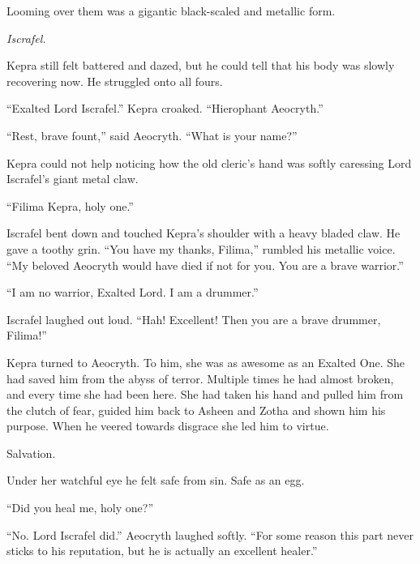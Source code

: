 \documentclass
  [a4paper,
   12pt,
   oneside
  ]%
  {article}
\begin{document}
Looming over them was a gigantic black-scaled and metallic form.

\emph{Iscrafel.}



Kepra still felt battered and dazed, but he could tell that his body was slowly recovering now. 
He struggled onto all fours. 

``Exalted Lord Iscrafel.'' Kepra croaked. ``Hierophant Aeocryth.''

``Rest, brave fount,'' said Aeocryth. ``What is your name?''

Kepra could not help noticing how the old cleric's hand was softly caressing Lord Iscrafel’s giant metal claw.

``Filima Kepra, holy one.'' 

Iscrafel bent down and touched Kepra's shoulder with a heavy bladed claw. 
He gave a toothy grin.
``You have my thanks, Filima,'' rumbled his metallic voice. ``My beloved Aeocryth would have died if not for you. You are a brave warrior.'' 

``I am no warrior, Exalted Lord. I am a drummer.''

Iscrafel laughed out loud. ``Hah! Excellent! Then you are a brave drummer, Filima!'' 

Kepra turned to Aeocryth. 
To him, she was as awesome as an Exalted One. 
She had saved him from the abyss of terror. 
Multiple times he had almost broken, and every time she had been here.
She had taken his hand and pulled him from the clutch of fear, guided him back to Asheen and Zotha and shown him his purpose.
When he veered towards disgrace she led him to virtue.

Salvation.

Under her watchful eye he felt safe from sin. Safe as an egg.

``Did you heal me, holy one?''

``No. Lord Iscrafel did.'' Aeocryth laughed softly. 
``For some reason this part never sticks to his reputation, but he is actually an excellent healer.''
\end{document}
